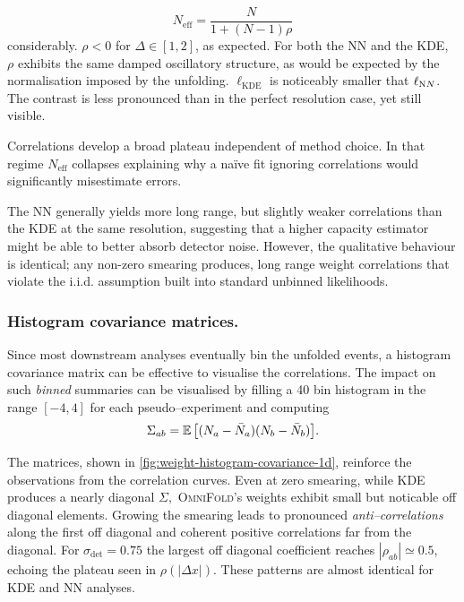 \begin{description}
\[                  N_{\text{eff}} = \frac{N}{1+(N-1)\rho}
                  \]
                  considerably.
                  \(\rho < 0\) for \(\Delta \in [1, 2]\), as expected.
                  For both the NN and the KDE, \(\rho\) exhibits the same damped oscillatory structure, as would be expected by the normalisation imposed by the unfolding.
                  \(\ell_{\text{KDE}}\) is noticeably smaller that \(\ell_{\text NN}\).
                  The contrast is less pronounced than in the perfect resolution case, yet still visible.
            \item[Moderate and large smearing ($\sigma_{\det}\ge0.5$):] Correlations develop a br\-oad plateau independent of method choice.
                In that regime $N_\text{eff}$ collapses explaining why a na\"ive fit ignoring  correlations would significantly misestimate errors.
            \end{description}
            
            The \textsc{NN} generally yields more long range, but {slightly weaker} correlations than the \textsc{KDE} at the same resolution, suggesting that a higher capacity estimator might be able to better absorb detector noise. 
            However, the qualitative behaviour is identical;
            any non-zero smearing produces, long range weight correlations that violate the i.i.d. assumption built into standard unbinned likelihoods.
        \subsubsection{Histogram covariance matrices.}
            Since most downstream analyses eventually bin the unfolded events, a histogram covariance matrix can be effective to visualise the correlations.
            The impact on such \emph{binned} summaries can be visualised by filling a 40 bin histogram in the range $[-4,4]$ for each pseudo--experiment and computing
            \[
              \Sigma_{ab} = \operatorname{\mathbb{E}}\qty[(N_a-\bar N_a)(N_b-\bar N_b)].
            \]
            
            The matrices, shown in \cref{fig:weight-histogram-covariance-1d}, reinforce the observations from the correlation curves.
            Even at zero smearing, while KDE produces a nearly diagonal $\Sigma,$ \textsc{OmniFold}'s weights exhibit small but noticable off diagonal elements.
            Growing the smearing leads to pronounced \emph{anti--correlations} along the first off diagonal and coherent positive correlations far from the diagonal.
            For $\sigma_{\det}=0.75$ the largest off diagonal coefficient reaches $|\rho_{ab}|\simeq0.5$, echoing the plateau seen in $\rho(|\Delta x|)$.  These patterns are almost identical for KDE and NN analyses.

